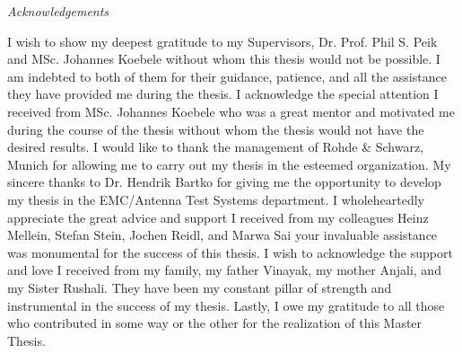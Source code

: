 


\newpage
\thispagestyle{empty}

\begin{center}
\Huge\emph{Acknowledgements}
\end{center}
\medskip

\noindent I wish to show my deepest gratitude to my Supervisors, Dr. Prof. Phil S. Peik and MSc. Johannes Koebele without whom this thesis would not be possible. I am indebted to both of them for their guidance, patience, and all the assistance they have provided me during the thesis. I acknowledge the special attention I received from MSc. Johannes Koebele who was a great mentor and motivated me during the course of the thesis without whom the thesis would not have the desired results. I would like to thank the management of Rohde \& Schwarz, Munich for allowing me to carry out my thesis in the esteemed organization. My sincere thanks to Dr. Hendrik Bartko for giving me the opportunity to develop my thesis in the EMC/Antenna Test Systems department. I wholeheartedly appreciate the great advice and support I received from my colleagues Heinz Mellein, Stefan Stein, Jochen Reidl, and Marwa Sai your invaluable assistance was monumental for the success of this thesis. I wish to acknowledge the support and love I received from my family, my father Vinayak, my mother Anjali, and my Sister Rushali. They have been my constant pillar of strength and instrumental in the success of my thesis. Lastly, I owe my gratitude to all those who contributed in some way or the other for the realization of this Master Thesis.


